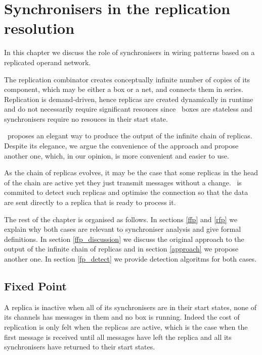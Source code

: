 \chapter{Synchronisers in the replication resolution}

In this chapter we discuss the role of synchronisers in wiring patterns based on a replicated operand network.

The replication combinator creates conceptually infinite number of copies of its component, which may be either a box or a net, and connects them in series. Replication is demand-driven, hence replicas are created dynamically in runtime and do not necessarily require significant resouces since \ak\ boxes are stateless and synchronisers require no resouces in their start state. %

\ak\ proposes an elegant way to produce the output of the infinite chain of replicas. Despite its elegance, we argue the convenience of the approach and propose another one, which, in our opinion, is more convenient and easier to use.

As the chain of replicas evolves, it may be the case that some replicas in the head of the chain are active yet they just transmit messages without a change. \ak\ is commited to detect such replicas and optimise the connection so that the data are sent directly to a replica that is ready to process it. 

The rest of the chapter is organised as follows. In sections \ref{ffp} and \ref{rfp} we explain why both cases are relevant to synchroniser analysis and give formal definitions. In section \ref{ffp_discussion} we discuss the original approach to the output of the infinite chain of replicas and in section \ref{approach} we propose another one. In section \ref{fp_detect} we provide detection algoritms for both cases.


    \section{Fixed Point}
A replica is inactive when all of its synchronisers are in their start states, none of its channels has messages in them and no box is running. Indeed the cost of replication is only felt when the replicas are active, which is the case when the first message is received until all messages have left the replica and all its synchronisers have returned to their start states.

